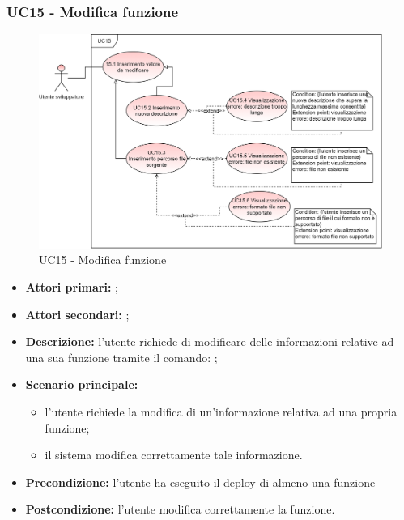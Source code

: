\subsubsection{UC15 - Modifica funzione }
\begin{figure}[H]
	\centering
	\includegraphics[scale=\ucs]{./res/img/UC15.png}
	\caption {UC15 - Modifica funzione }
\end{figure}
\begin{itemize}
	\item \textbf{Attori primari:} \us{};
	\item \textbf{Attori secondari:} \re{};
	\item \textbf{Descrizione:} l’utente richiede di modificare delle informazioni relative ad una sua funzione tramite il comando: \pedit{};
	\item \textbf{Scenario principale:} 
	\begin{itemize}
		\item  l’utente richiede la modifica di un’informazione relativa ad una propria funzione;
		\item il sistema modifica correttamente tale informazione.  
	\end{itemize}
	\item \textbf{Precondizione:} l’utente ha eseguito il deploy di almeno una funzione
	\item \textbf{Postcondizione:} l’utente modifica correttamente la funzione. 
\end{itemize}